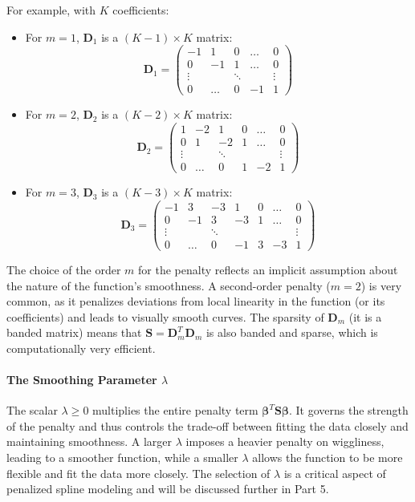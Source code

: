 \documentclass[11pt, a4paper]{article}
\begin{document}
For example, with $K$ coefficients:
\begin{itemize}
 \item For $m=1$, $\mathbf{D}_1$ is a $(K-1) \times K$ matrix:
 \[ \mathbf{D}_1 = \begin{pmatrix} -1 & 1 & 0 & \dots & 0 \\ 0 & -1 & 1 & \dots & 0 \\ \vdots & & \ddots & & \vdots \\ 0 & \dots & 0 & -1 & 1 \end{pmatrix} \]
 \item For $m=2$, $\mathbf{D}_2$ is a $(K-2) \times K$ matrix:
 \[ \mathbf{D}_2 = \begin{pmatrix} 1 & -2 & 1 & 0 & \dots & 0 \\ 0 & 1 & -2 & 1 & \dots & 0 \\ \vdots & & \ddots & & & \vdots \\ 0 & \dots & 0 & 1 & -2 & 1 \end{pmatrix} \]
 \item For $m=3$, $\mathbf{D}_3$ is a $(K-3) \times K$ matrix:
 \[ \mathbf{D}_3 = \begin{pmatrix} -1 & 3 & -3 & 1 & 0 & \dots & 0 \\ 0 & -1 & 3 & -3 & 1 & \dots & 0 \\ \vdots & & \ddots & & & & \vdots \\ 0 & \dots & 0 & -1 & 3 & -3 & 1 \end{pmatrix} \]
\end{itemize}
The choice of the order $m$ for the penalty reflects an implicit assumption about the nature of the function's smoothness. A second-order penalty ($m=2$) is very common, as it penalizes deviations from local linearity in the function (or its coefficients) and leads to visually smooth curves. The sparsity of $\mathbf{D}_m$ (it is a banded matrix) means that $\mathbf{S}=\mathbf{D}_m^T\mathbf{D}_m$ is also banded and sparse, which is computationally very efficient.

\paragraph{The Smoothing Parameter $\lambda$}
The scalar $\lambda \ge 0$ multiplies the entire penalty term $\boldsymbol{\beta}^T \mathbf{S} \boldsymbol{\beta}$. It governs the strength of the penalty and thus controls the trade-off between fitting the data closely and maintaining smoothness. A larger $\lambda$ imposes a heavier penalty on wiggliness, leading to a smoother function, while a smaller $\lambda$ allows the function to be more flexible and fit the data more closely. The selection of $\lambda$ is a critical aspect of penalized spline modeling and will be discussed further in Part 5.
\end{document}
